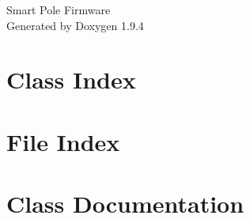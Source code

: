 \documentclass[twoside]{book}
\newcommand{\+}{\discretionary{\mbox{\scriptsize$\hookleftarrow$}}{}{}}
\newcommand{\clearemptydoublepage}{%
    \newpage{\pagestyle{empty}\cleardoublepage}%
  }
\begin{document}
  \raggedbottom
    \hypersetup{pageanchor=false,
                bookmarksnumbered=true,
                pdfencoding=unicode
               }
  \begin{titlepage}
  \vspace*{7cm}
  \begin{center}%
  {\Large Smart Pole Firmware}\\
  \vspace*{1cm}
  {\large Generated by Doxygen 1.9.4}\\
  \end{center}
  \end{titlepage}
  \clearemptydoublepage
  \tableofcontents
  \clearemptydoublepage
  \hypersetup{pageanchor=true}
\chapter{Class Index}

\chapter{File Index}

\chapter{Class Documentation}



\end{document}
